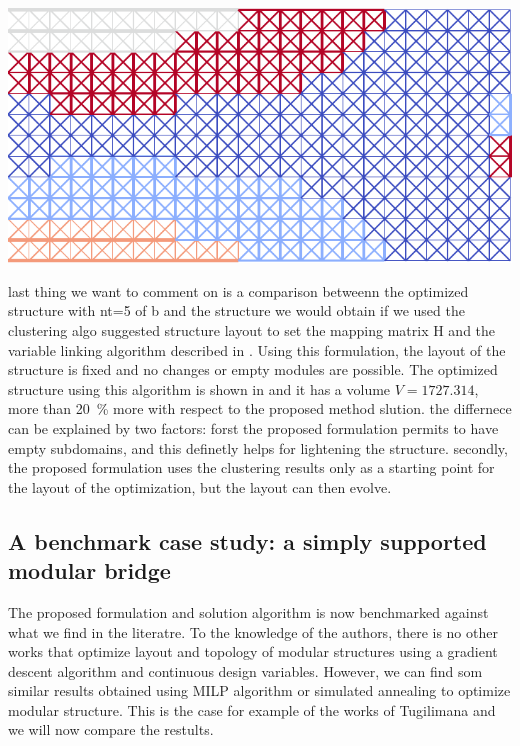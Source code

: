 \begin{marginfigure}
    \centering
    \includegraphics[width=\linewidth]{figures/06_DMO/00_optimized_modules/VL/nt=5VL.pdf}
    \caption{$V = 1727.314$}
    \label{fig:06_cant_variable_link}
\end{marginfigure}

last thing we want to comment on is a comparison betweenn the optimized structure with nt=5 of b and the structure we would obtain if we used the clustering algo suggested structure layout to set the mapping matrix H and the variable linking algorithm described in . Using this formulation, the layout of the structure is fixed and no changes or empty modules are possible. The optimized structure using this algorithm is shown in  and it has a volume $V = 1727.314$, more than \qty{20}{\percent} more with respect to the proposed method slution. the differnece can be explained by two factors: forst the proposed formulation permits to have empty subdomains, and this definetly helps for lightening the structure. secondly, the  proposed formulation uses the clustering results only as a starting point for the layout of the optimization, but the layout can then evolve.

\subsection{A benchmark case study: a simply supported modular bridge}
The proposed formulation and solution algorithm is now benchmarked against what we find in the literatre. To the knowledge of the authors, there is no other works that optimize layout and topology of modular structures using a gradient descent algorithm and continuous design variables. However, we can find som similar results obtained using MILP algorithm or simulated annealing to optimize modular structure. This is the case for example of the works of Tugilimana  and we will now compare the restults. 

